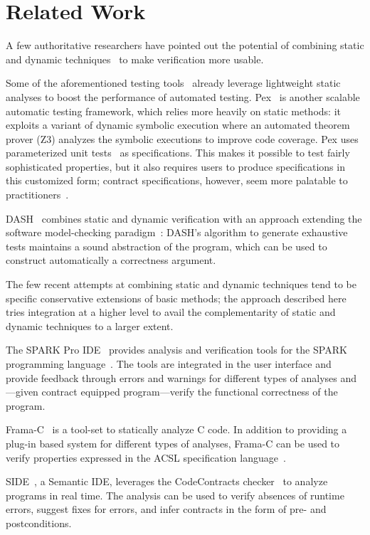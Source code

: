 \section{Related Work}
\label{sec:va-related}



A few authoritative researchers have pointed out the potential of combining static and dynamic techniques~\cite{RAJAMANI09,ERNST10,FRASER10} to make verification more usable.

Some of the aforementioned testing tools~\cite{GODEFROID05,SEN05,CADAR08} already leverage lightweight static analyses to boost the performance of automated testing. 
Pex~\cite{TILLMANN08} is another scalable automatic testing framework, which relies more heavily on static methods: it exploits a variant of dynamic symbolic execution where an automated theorem prover (Z3) analyzes the symbolic executions to improve code coverage.  Pex uses parameterized unit tests~\cite{TILLMANN05} as specifications. 
This makes it possible to test fairly sophisticated properties, but it also requires users to produce specifications in this customized form; contract specifications, however, seem more palatable to practitioners~\cite{CHALIN06b}.

DASH~\cite{RAJAMANI09} combines static and dynamic verification with an approach extending the software model-checking paradigm~\cite{BEYER07}: DASH's algorithm to generate exhaustive tests maintains a sound abstraction of the program, which can be used to construct automatically a correctness argument.

The few recent attempts at combining static and dynamic techniques tend to be specific conservative extensions of basic methods; the approach described here tries integration at a higher level to avail the complementarity of static and dynamic techniques to a larger extent.

The SPARK Pro IDE~\cite{SPARKPRO} provides analysis and verification tools for the SPARK programming language~\cite{BARNES03}. The tools are integrated in the user interface and provide feedback through errors and warnings for different types of analyses and---given contract equipped program---verify the functional correctness of the program.

Frama-C~\cite{CUOQ12,CORRENSON12} is a tool-set to statically analyze C code. In addition to providing a plug-in based system for different types of analyses, Frama-C can be used to verify properties expressed in the ACSL specification language~\cite{ACSL}.

SIDE~\cite{LOGOZZO12b}, a Semantic IDE, leverages the CodeContracts checker~\cite{FAEHNDRICH10} to analyze programs in real time. The analysis can be used to verify absences of runtime errors, suggest fixes for errors, and infer contracts in the form of pre- and postconditions.

